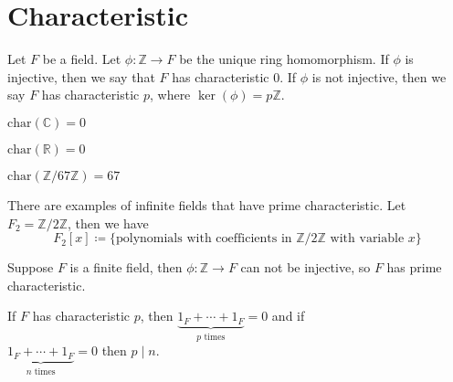 \section{Characteristic}
\begin{definition}[Characteristic]
	Let \(F\) be a field. Let \(\phi \colon \mathbb{Z} \to F\) be the unique ring homomorphism. If \(\phi \) is injective, then we say that \(F\) has characteristic \(0\). If \(\phi \) is not injective, then we say \(F\) has characteristic \(p\), where \(\ker(\phi ) = p\mathbb{Z} \).
\end{definition}
\begin{eg}
	\(\text{char}(\mathbb{C} ) = 0\)
\end{eg}
\begin{eg}
	\(\text{char}(\mathbb{R} ) = 0\)
\end{eg}
\begin{eg}
	\(\text{char}(\mathbb{Z} / 67\mathbb{Z}  ) = 67\)
\end{eg}
\begin{eg}[\textcolor{green}{ask sarah}]
    There are examples of infinite fields that have prime characteristic. Let \(F_2 = \mathbb{Z} /2\mathbb{Z} \), then we have
    \[
        F_2[x] \coloneqq \{ \text{polynomials with coefficients in } \mathbb{Z} /2\mathbb{Z} \text{ with variable } x \} 
    \]
\end{eg}
\begin{lemma}
	Suppose \(F\) is a finite field, then \(\phi \colon \mathbb{Z} \to F\) can not be injective, so \(F\) has prime characteristic.
\end{lemma}
\begin{lemma}
	If \(F\) has characteristic \(p\), then \(\underbrace{1_F + \cdots + 1_F}_{p \text{ times} } = 0\) and if \\ \(\underbrace{1_F + \cdots + 1_F}_{n \text{ times} } = 0\) then \(p\mid n\).
\end{lemma}

